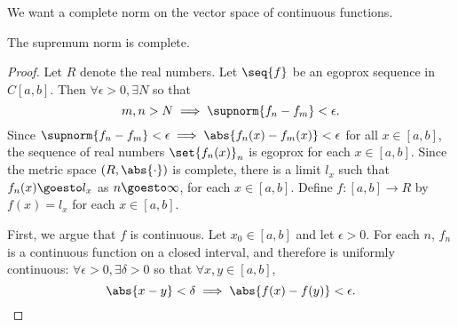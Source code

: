 
\sbasic



\sstart



We want a complete
norm on the vector
space of continuous
functions.


\begin{prop}
The supremum norm
is complete.

\begin{proof}
Let $R$ denote the real numbers.
Let $\seq{f}$ be an egoprox sequence
in $C[a, b]$.
Then
$\forall \epsilon > 0, \exists N$
so that
\[
  m, n > N \implies \supnorm{f_n - f_m} < \epsilon.
\]
Since $\supnorm{f_n - f_m} < \epsilon \implies
\abs{f_n(x) - f_m(x)} < \epsilon$ for
all $x \in [a, b]$, the
sequence of real numbers $\set{f_n(x)}_n$
is egoprox for each $x \in [a, b]$.
Since the metric space $(R, \abs{\cdot})$
is complete, there is a limit $l_x$
such that $f_n(x) \goesto l_x$ as
$n \goesto \infty$, for each $x \in [a, b]$.
Define $f: [a, b] \to R$
by $f(x) = l_x$ for each $x \in [a, b]$.

First, we argue that $f$ is continuous.
Let $x_0 \in [a, b]$ and let $\epsilon > 0$.
For each $n$, $f_n$ is a continuous function
on a closed interval, and therefore is
uniformly continuous:
$\forall \epsilon > 0, \exists \delta > 0$
so that $\forall x, y \in [a, b]$,
\[
  \abs{x - y} < \delta \implies \abs{f(x) - f(y)} < \epsilon.
\]


\end{proof}
\end{prop}
